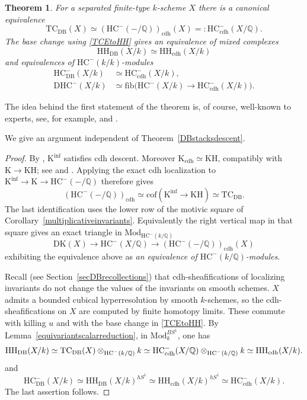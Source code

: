 \documentclass{amsart}
\theoremstyle{plain}
\newtheorem{theorem}[prop]{Theorem}
\theoremstyle{definition}
\newcommand{\bbQ}{\mathbb{Q}}
\newcommand{\TC}{\mathrm{TC}}
\newcommand{\HH}{\mathrm{HH}}
\newcommand{\HC}{\mathrm{HC}}
\newcommand{\fib}{\mathrm{fib}}
\newcommand{\cof}{\mathrm{cof}}
\newcommand{\K}{\mathrm{K}}
\newcommand{\KH}{\mathrm{KH}}
\newcommand{\DK}{\mathrm{DK}}
\newcommand{\DHC}{\mathrm{DHC}}
\newcommand{\Mod}{\mathrm{Mod}}
\newcommand{\DB}{\mathrm{DB}}
\newcommand{\cdh}{\mathrm{cdh}}
\begin{document}
\begin{theorem}\label{thmcdhTCDB}
For a separated finite-type $k$-scheme $X$ there is a canonical equivalence
\[
\TC_{\DB}(X)\simeq (\HC^-(-/\bbQ))_{\cdh}(X)=:\HC^-_{\cdh}(X/\bbQ).
\]
The base change using \eqref{TCEtoHH} gives an equivalence of mixed complexes
\begin{equation}\label{HHDBcdhHH}
\HH_{\DB}(X/k)\simeq \HH_{\cdh}(X/k)
\end{equation}
and equivalences of $\HC^-(k/k)$-modules
\begin{equation}\label{eqTCDBcdhHCminus}
\begin{split}
\HC^-_{\DB}(X/k)&\simeq \HC^-_{\cdh}(X/k),\\
\DHC^-(X/k)&\simeq\fib\bigl(\HC^-(X/k)\to \HC^-_{\cdh}(X/k)\bigr).
\end{split}
\end{equation}
\end{theorem}

The idea behind the first statement of the theorem is, of course, well-known to experts, see, for example, \cite[Section 8.1]{EKS25} and \cite[Appendix A]{Loe26}.

We give an argument independent of Theorem~\ref{DBstacksdescent}.

\begin{proof}
By \cite[Theorem 4.6]{CHSW08}, $\K^{\mathrm{inf}}$ satisfies cdh descent. Moreover
$\K_{\cdh}\simeq \KH$, compatibly with $\K\to \KH$; see
\cite[Theorem 6.4]{Hae04} and \cite[Example 3.14]{CHSW08}. Applying the exact cdh localization to
$\K^{\mathrm{inf}}\to \K\to \HC^-(-/\bbQ)$ therefore gives
\[
(\HC^-(-/\bbQ))_{\cdh}
 \simeq\cof(\K^{\mathrm{inf}}\to \KH)\simeq \TC_{\DB}.
\]
The last identification uses the lower row of the motivic square of Corollary~\ref{multiplicativeinvariants}. Equivalently the right vertical map in that square gives an exact triangle in $\Mod_{\HC^-(k/\bbQ)}$
\[
\DK(X)\longrightarrow \HC^-(X/\bbQ)
 \longrightarrow(\HC^-(-/\bbQ))_{\cdh}(X)
\] exhibiting the equivalence above as \emph{an equivalence of $\HC^-(k/\bbQ)$-modules}.

Recall (see Section~\ref{secDBrecollections}) that cdh-sheafifications of localizing invariants do not change the values of the invariants on smooth schemes. $X$ admits a bounded cubical hyperresolution by smooth
$k$-schemes, so the cdh-sheafifications on $X$ 
are computed by finite homotopy limits. These commute with killing $u$ and with the base change in \eqref{TCEtoHH}. By Lemma~\ref{equivariantscalarreduction}, in $\Mod_k^{BS^1}$, one has
\[
\HH_{\DB}(X/k)
\simeq \TC_{\DB}(X)\otimes_{\HC^-(k/\bbQ)}k\\
\simeq \HC^-_{\cdh}(X/\bbQ)\otimes_{\HC^-(k/\bbQ)}k
 \simeq \HH_{\cdh}(X/k).
\]
and
\[
\HC^-_{\DB}(X/k)
\simeq \HH_{\DB}(X/k)^{hS^1}
\simeq \HH_{\cdh}(X/k)^{hS^1}
 \simeq \HC^-_{\cdh}(X/k).
\]
The last assertion follows.
\end{proof}
\end{document}
